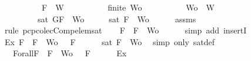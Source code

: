 \begin{isabellebody}
\ \ \ \ \ \ \ \ \ \ {\isachardoublequoteopen}F\ {\isasymin}\ W{\isachardoublequoteclose}\isanewline
\ \ \ \ \ \ \ \ \ \ {\isachardoublequoteopen}finite\ Wo{\isachardoublequoteclose}\isanewline
\ \ \ \ \ \ \ \ \ \ {\isachardoublequoteopen}Wo\ {\isasymsubseteq}\ W{\isachardoublequoteclose}\isanewline
\ \ \ \ \ \ \ \ \ {\isachardoublequoteopen}sat\ {\isacharparenleft}{\isacharbraceleft}G{\isacharcomma}F{\isacharbraceright}\ {\isasymunion}\ Wo{\isacharparenright}{\isachardoublequoteclose}\isanewline
%
\isadelimproof
%
\endisadelimproof
%
\isatagproof
{}\isamarkupfalse%
\ {\isacharminus}\isanewline
\ \ \isamarkupfalse%
\ {\isachardoublequoteopen}sat\ {\isacharparenleft}{\isacharbraceleft}F{\isacharbraceright}\ {\isasymunion}\ Wo{\isacharparenright}{\isachardoublequoteclose}\isanewline
\ \ \ \ \isamarkupfalse%
\ assms{\isacharparenleft}{}{\isacharcomma}{}{\isacharcomma}{}{\isacharcomma}{}{\isacharparenright}\ \isamarkupfalse%
\ {\isacharparenleft}rule\ pcp{\isacharunderscore}colecComp{\isacharunderscore}elem{\isacharunderscore}sat{\isacharparenright}\isanewline
\ \ \isamarkupfalse%
\ {\isachardoublequoteopen}F\ {\isasymin}\ {\isacharbraceleft}F{\isacharbraceright}\ {\isasymunion}\ Wo{\isachardoublequoteclose}\isanewline
\ \ \ \ \isamarkupfalse%
\ {\isacharparenleft}simp\ add{\isacharcolon}\ insertI{}{\isacharparenright}\isanewline
\ \ \isamarkupfalse%
\ Ex{}{\isacharcolon}{\isachardoublequoteopen}{\isasymexists}{\isasymA}{\isachardot}\ {\isasymforall}F\ {\isasymin}\ {\isacharparenleft}{\isacharbraceleft}F{\isacharbraceright}\ {\isasymunion}\ Wo{\isacharparenright}{\isachardot}\ {\isasymA}\ {\isasymTurnstile}\ F{\isachardoublequoteclose}\isanewline
\ \ \ \ \isamarkupfalse%
\ {\isacartoucheopen}sat\ {\isacharparenleft}{\isacharbraceleft}F{\isacharbraceright}\ {\isasymunion}\ Wo{\isacharparenright}{\isacartoucheclose}\ \isamarkupfalse%
\ {\isacharparenleft}simp\ only{\isacharcolon}\ sat{\isacharunderscore}def{\isacharparenright}\isanewline
\ \ \isamarkupfalse%
\ {\isasymA}\ \ Forall{}{\isacharcolon}{\isachardoublequoteopen}{\isasymforall}F\ {\isasymin}\ {\isacharparenleft}{\isacharbraceleft}F{\isacharbraceright}\ {\isasymunion}\ Wo{\isacharparenright}{\isachardot}\ {\isasymA}\ {\isasymTurnstile}\ F{\isachardoublequoteclose}\isanewline
\ \ \ \ \isamarkupfalse%
\ Ex{}\ \isamarkupfalse%

\end{isabellebody}
